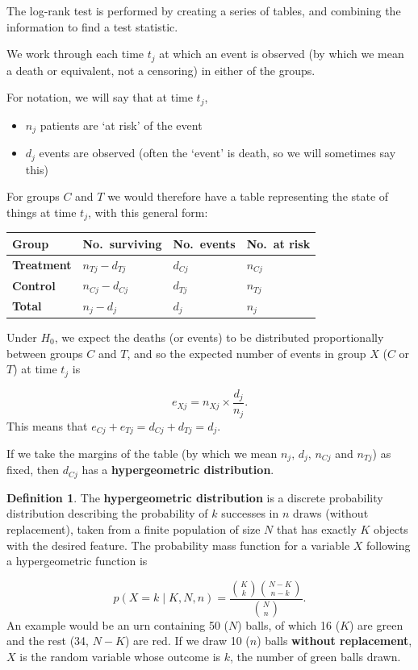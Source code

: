 \documentclass[
  openany]{book}
\providecommand{\tightlist}{%
  \setlength{\itemsep}{0pt}\setlength{\parskip}{0pt}}
\theoremstyle{definition}
\newtheorem{definition}{Definition}[chapter]
\theoremstyle{definition}
\theoremstyle{definition}
\theoremstyle{definition}
\theoremstyle{remark}
\begin{document}
The log-rank test is performed by creating a series of tables, and combining the information to find a test statistic.

We work through each time \(t_j\) at which an event is observed (by which we mean a death or equivalent, not a censoring) in either of the groups.

For notation, we will say that at time \(t_j\),

\begin{itemize}
\tightlist
\item
  \(n_j\) patients are `at risk' of the event
\item
  \(d_j\) events are observed (often the `event' is death, so we will sometimes say this)
\end{itemize}

For groups \(C\) and \(T\) we would therefore have a table representing the state of things at time \(t_j\), with this general form:

\begin{longtable}[]{@{}llll@{}}
\toprule\noalign{}
Group & No.~surviving & No.~events & No.~at risk \\
\midrule\noalign{}
\endhead
\bottomrule\noalign{}
\endlastfoot
\textbf{Treatment} & \(n_{Tj}-d_{Tj}\) & \(d_{Cj}\) & \(n_{Cj}\) \\
\textbf{Control} & \(n_{Cj}-d_{Cj}\) & \(d_{Tj}\) & \(n_{Tj}\) \\
\textbf{Total} & \(n_j-d_j\) & \(d_j\) & \(n_j\) \\
\end{longtable}

Under \(H_0\), we expect the deaths (or events) to be distributed proportionally between groups \(C\) and \(T\), and so the expected number of events in group \(X\) (\(C\) or \(T\)) at time \(t_j\) is

\[e_{Xj} = n_{Xj}\times{\frac{d_j}{n_j}}.\]
This means that \(e_{Cj}+e_{Tj} = d_{Cj} + d_{Tj} = d_j\).

If we take the margins of the table (by which we mean \(n_j, \,d_j,\,n_{Cj}\) and \(n_{Tj}\)) as fixed, then \(d_{Cj}\) has a \textbf{hypergeometric distribution}.

\begin{definition}
The \textbf{hypergeometric distribution} is a discrete probability distribution describing the probability of \(k\) successes in \(n\) draws (without replacement), taken from a finite population of size \(N\) that has exactly \(K\) objects with the desired feature. The probability mass function for a variable \(X\) following a hypergeometric function is

\[p\left(X=k\mid{K,N,n}\right) = \frac{{\binom{K}{k}}{\binom{N-K}{n-k}}}{{\binom{N}{n}}}. \]
An example would be an urn containing 50 (\(N\)) balls, of which 16 (\(K\)) are green and the rest (34, \(N-K\)) are red. If we draw 10 (\(n\)) balls \textbf{without replacement}, \(X\) is the random variable whose outcome is \(k\), the number of green balls drawn.
\end{definition}
\end{document}
